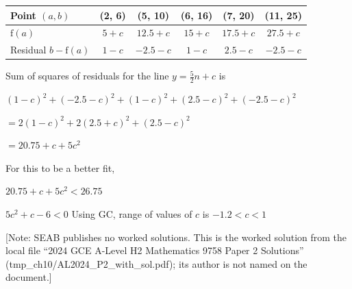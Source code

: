 {{\centering\setlength{\tabcolsep}{4pt}\begin{tabular}{|l|c|c|c|c|c|}\hline
Point $(a,b)$ & (2, 6) & (5, 10) & (6, 16) & (7, 20) & (11, 25)\\\hline
$\mathrm{f}(a)$ & $5+c$ & $12.5+c$ & $15+c$ & $17.5+c$ & $27.5+c$\\\hline
Residual $b-\mathrm{f}(a)$ & $1-c$ & $-2.5-c$ & $1-c$ & $2.5-c$ & $-2.5-c$\\\hline\end{tabular}\par}\smallskip
Sum of squares of residuals for the line $y=\frac52n+c$ is\par
$(1-c)^2+(-2.5-c)^2+(1-c)^2+(2.5-c)^2+(-2.5-c)^2$\par
$=2(1-c)^2+2(2.5+c)^2+(2.5-c)^2$\par
$=20.75+c+5c^2$\par\medskip
For this to be a better fit,\par
$20.75+c+5c^2<26.75$\par
$5c^2+c-6<0$
\figALparab
Using GC, range of values of $c$ is \underline{$-1.2<c<1$}\par\smallskip
{\color{black!55}\footnotesize[Note: SEAB publishes no worked solutions. This is the worked solution from the local file ``2024 GCE A-Level H2 Mathematics 9758 Paper 2 Solutions'' (tmp\_ch10/AL2024\_P2\_with\_sol.pdf); its author is not named on the document.]}
}
